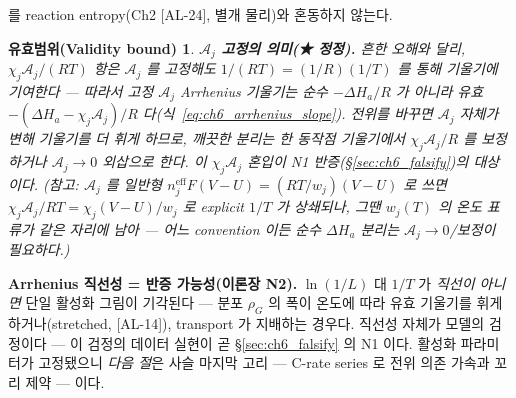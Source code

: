 \documentclass[11pt,a4paper]{article}
\newtheorem*{boundbox}{유효범위(Validity bound)}
\newcommand{\eff}{\mathrm{eff}}
\newcommand{\AL}[1]{\textsf{[AL-#1]}}
\begin{document}
를 reaction entropy(Ch2 \AL{24}, 별개 물리)와 혼동하지 않는다.
\begin{boundbox}
\textbf{$\mathcal A_j$ 고정의 의미(★ 정정).} 흔한 오해와 달리, $\chi_j\mathcal A_j/(RT)$ 항은 $\mathcal A_j$ 를
\emph{고정해도} $1/(RT)=(1/R)(1/T)$ 를 통해 기울기에 기여한다 — 따라서 고정 $\mathcal A_j$ Arrhenius 기울기는 순수
$-\Delta H_a/R$ 가 아니라 \emph{유효} $-(\Delta H_a-\chi_j\mathcal A_j)/R$ 다(식~\eqref{eq:ch6_arrhenius_slope}).
전위를 \emph{바꾸면} $\mathcal A_j$ 자체가 변해 기울기를 더 휘게 하므로, 깨끗한 분리는 한 동작점 기울기에서
$\chi_j\mathcal A_j/R$ 를 보정하거나 $\mathcal A_j\to0$ 외삽으로 한다. 이 $\chi_j\mathcal A_j$ 혼입이 N1
반증(\S\ref{sec:ch6_falsify})의 대상이다. (참고: $\mathcal A_j$ 를 일반형 $n_j^\eff F(V-U)=(RT/w_j)(V-U)$ 로 쓰면
$\chi_j\mathcal A_j/RT=\chi_j(V-U)/w_j$ 로 explicit $1/T$ 가 상쇄되나, 그땐 $w_j(T)$ 의 온도 표류가 같은 자리에 남아
— 어느 convention 이든 순수 $\Delta H_a$ 분리는 $\mathcal A_j\to0$/보정이 필요하다.)
\end{boundbox}
\textbf{Arrhenius 직선성 = 반증 가능성(이론장 N2).} $\ln(1/L)$ 대 $1/T$ 가 \emph{직선이 아니면} 단일 활성화 그림이
기각된다 — 분포 $\rho_G$ 의 폭이 온도에 따라 유효 기울기를 휘게 하거나(stretched, \AL{14}), transport 가
지배하는 경우다. 직선성 자체가 모델의 검정이다 — 이 검정의 데이터 실현이 곧 \S\ref{sec:ch6_falsify} 의 N1 이다.
활성화 파라미터가 고정됐으니 \emph{다음 절}은 사슬 마지막 고리 — C-rate series 로 전위 의존 가속과 꼬리 제약 — 이다.

\end{document}
